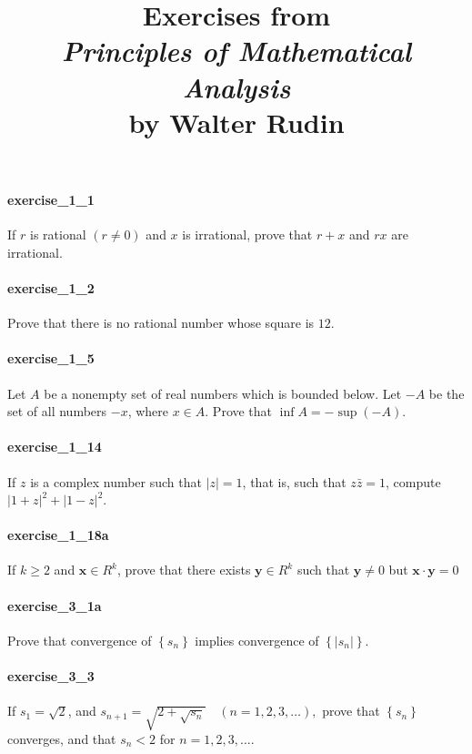 \documentclass{article}
\title{\textbf{
Exercises from \\
\textit{Principles of Mathematical Analysis} \\
by Walter Rudin
}}
\date{}
\begin{document}
\maketitle

\paragraph{exercise\_1\_1} If $r$ is rational $(r \neq 0)$ and $x$ is irrational, prove that $r+x$ and $r x$ are irrational.

\paragraph{exercise\_1\_2} Prove that there is no rational number whose square is $12$.

\paragraph{exercise\_1\_5} Let $A$ be a nonempty set of real numbers which is bounded below. Let $-A$ be the set of all numbers $-x$, where $x \in A$. Prove that $\inf A=-\sup (-A)$.

\paragraph{exercise\_1\_14} If $z$ is a complex number such that $|z|=1$, that is, such that $z \bar{z}=1$, compute $|1+z|^{2}+|1-z|^{2}$.

\paragraph{exercise\_1\_18a} If $k \geq 2$ and $\mathbf{x} \in R^{k}$, prove that there exists $\mathbf{y} \in R^{k}$ such that $\mathbf{y} \neq 0$ but $\mathbf{x} \cdot \mathbf{y}=0$

\paragraph{exercise\_3\_1a} Prove that convergence of $\left\{s_{n}\right\}$ implies convergence of $\left\{\left|s_{n}\right|\right\}$.

\paragraph{exercise\_3\_3} If $s_{1}=\sqrt{2}$, and $s_{n+1}=\sqrt{2+\sqrt{s_{n}}} \quad(n=1,2,3, \ldots),$ prove that $\left\{s_{n}\right\}$ converges, and that $s_{n}<2$ for $n=1,2,3, \ldots$.
\end{document}
